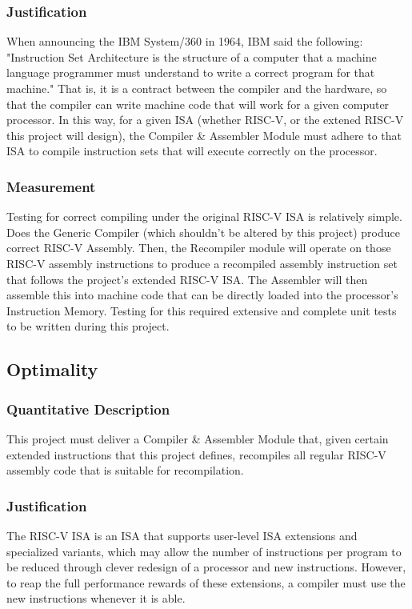 \subsubsection{Justification}
When announcing the IBM System/360 in 1964, IBM said the following: "Instruction Set Architecture is the structure of a computer that a machine language programmer must understand to write a correct program for that machine."\cite{IBM1964} That is, it is a contract between the compiler and the hardware, so that the compiler can write machine code that will work for a given computer processor. In this way, for a given ISA (whether RISC-V, or the extened RISC-V this project will design), the Compiler \& Assembler Module must adhere to that ISA to compile instruction sets that will execute correctly on the processor.
\subsubsection{Measurement}
Testing for correct compiling under the original RISC-V ISA is relatively simple. Does the Generic Compiler (which shouldn't be altered by this project) produce correct RISC-V Assembly. Then, the Recompiler module will operate on those RISC-V assembly instructions to produce a recompiled assembly instruction set that follows the project's extended RISC-V ISA. The Assembler will then assemble this into machine code that can be directly loaded into the processor's Instruction Memory. Testing for this required extensive and complete unit tests to be written during this project.

\subsection{Optimality}
\subsubsection{Quantitative Description}
This project must deliver a Compiler \& Assembler Module that, given certain extended instructions that this project defines, recompiles all regular RISC-V assembly code that is suitable for recompilation. 
\subsubsection{Justification}
The RISC-V \ac{ISA} is an ISA that supports user-level ISA extensions and specialized variants\cite{Isa2012}, which may allow the number of instructions per program to be reduced through clever redesign of a processor and new instructions. However, to reap the full performance rewards of these extensions, a compiler must use the new instructions whenever it is able.
